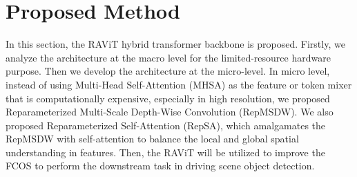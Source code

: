 \section{Proposed Method}
In this section, the RAViT hybrid transformer backbone is proposed. Firstly, we analyze the architecture at the macro level for the limited-resource hardware purpose. Then we develop the architecture at the micro-level. In  micro level, instead of using Multi-Head Self-Attention (MHSA) as the feature or token mixer that is computationally expensive, especially in high resolution, we proposed Reparameterized Multi-Scale Depth-Wise Convolution (RepMSDW). We also proposed Reparameterized Self-Attention (RepSA), which amalgamates the RepMSDW with self-attention to balance the local and global spatial understanding in features. Then, the RAViT will be utilized to improve the FCOS to perform the downstream task in driving scene object detection.
